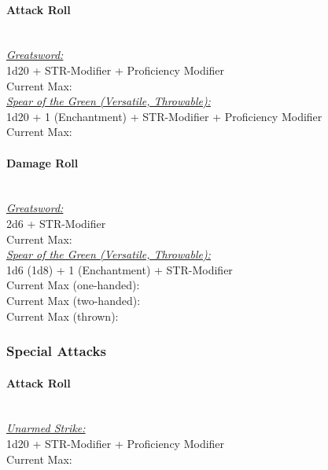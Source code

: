 \documentclass[letterpaper,openany,oneside,twocolumn]{book}
\begin{document}
\paragraph*{Attack Roll}\hfill\\
\underline{\textit{Greatsword:}}\\
1d20 + STR-Modifier + Proficiency Modifier\\
\indent Current Max: 
\\
\underline{\textit{Spear of the Green (Versatile, Throwable):}}\\
1d20 + 1 (Enchantment) + STR-Modifier + Proficiency Modifier\\
\indent Current Max: 
\paragraph*{Damage Roll}\hfill\\
\underline{\textit{Greatsword:}}\\
2d6 + STR-Modifier\\
\indent Current Max: 
\\
\underline{\textit{Spear of the Green (Versatile, Throwable):}}\\
1d6 (1d8) + 1 (Enchantment) + STR-Modifier\\
\indent Current Max (one-handed): \\
\indent Current Max (two-handed): \\
\indent Current Max (thrown): 
\subsubsection*{Special Attacks}
\paragraph*{Attack Roll}\hfill\\
\underline{\textit{Unarmed Strike:}}\\
1d20 + STR-Modifier + Proficiency Modifier\\
\indent Current Max: 
\end{document}
